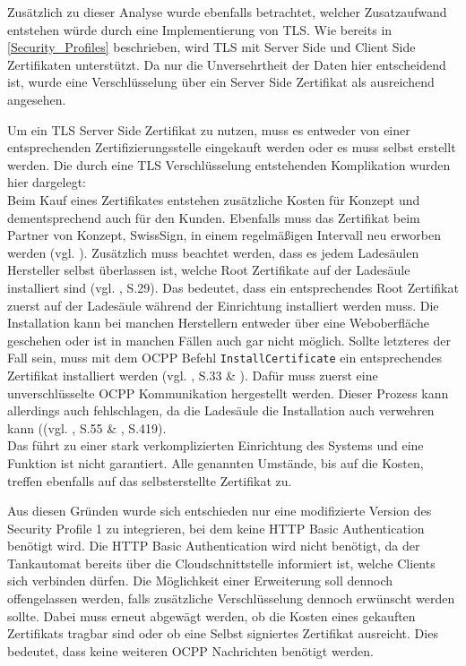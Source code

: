 \noindent Zusätzlich zu dieser Analyse wurde ebenfalls betrachtet, welcher Zusatzaufwand entstehen würde durch eine Implementierung von TLS. Wie bereits in \autoref{Security_Profiles} beschrieben, wird TLS mit Server Side und Client Side Zertifikaten unterstützt. Da nur die Unversehrtheit der Daten hier entscheidend ist, wurde eine Verschlüsselung über ein Server Side Zertifikat als ausreichend angesehen. \newline

\noindent Um ein TLS Server Side Zertifikat zu nutzen, muss es entweder von einer entsprechenden Zertifizierungsstelle eingekauft werden oder es muss selbst erstellt werden. Die durch eine TLS Verschlüsselung entstehenden Komplikation wurden hier dargelegt:\\
Beim Kauf eines Zertifikates entstehen zusätzliche Kosten für Konzept und dementsprechend auch für den Kunden. Ebenfalls muss das Zertifikat beim Partner von Konzept, SwissSign, in einem regelmäßigen Intervall neu erworben werden (vgl. \cite{Swiss_sign}). Zusätzlich muss beachtet werden, dass es jedem Ladesäulen Hersteller selbst überlassen ist, welche Root Zertifikate auf der Ladesäule installiert sind (vgl. \cite{OCPP-2.0.1-part2-specification-edition2}, S.29). Das bedeutet, dass ein entsprechendes Root Zertifikat zuerst auf der Ladesäule während der Einrichtung installiert werden muss. Die Installation kann bei manchen Herstellern entweder über eine Weboberfläche geschehen oder ist in manchen Fällen auch gar nicht möglich. Sollte letzteres der Fall sein, muss mit dem OCPP Befehl \verb|InstallCertificate| ein entsprechendes Zertifikat installiert werden (vgl. \cite{OCPP-1.6-security-whitepaper-edition-3}, S.33 \& \cite{OCPP-2.0.1-part2-specification-edition2}). Dafür muss zuerst eine unverschlüsselte OCPP Kommunikation hergestellt werden. Dieser Prozess kann allerdings auch fehlschlagen, da die Ladesäule die Installation auch verwehren kann ((vgl. \cite{OCPP-1.6-security-whitepaper-edition-3}, S.55 \& \cite{OCPP-2.0.1-part2-specification-edition2}, S.419). \\
\noindent Das führt zu einer stark verkomplizierten Einrichtung des Systems und eine Funktion ist nicht garantiert. Alle genannten Umstände, bis auf die Kosten, treffen ebenfalls auf das selbsterstellte Zertifikat zu.\newline

\noindent Aus diesen Gründen wurde sich entschieden nur eine modifizierte Version des Security Profile 1 zu integrieren, bei dem keine HTTP Basic Authentication benötigt wird. Die HTTP Basic Authentication wird nicht benötigt, da der Tankautomat bereits über die Cloudschnittstelle informiert ist, welche Clients sich verbinden dürfen. Die Möglichkeit einer Erweiterung soll dennoch offengelassen werden, falls zusätzliche Verschlüsselung dennoch erwünscht werden sollte. Dabei muss erneut abgewägt werden, ob die Kosten eines gekauften Zertifikats tragbar sind oder ob eine Selbst signiertes Zertifikat ausreicht. Dies bedeutet, dass keine weiteren OCPP Nachrichten benötigt werden.

